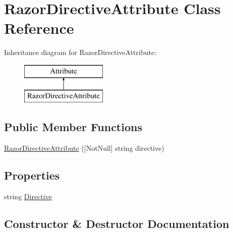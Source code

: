 \hypertarget{class_razor_directive_attribute}{}\section{Razor\+Directive\+Attribute Class Reference}
\label{class_razor_directive_attribute}
Inheritance diagram for Razor\+Directive\+Attribute\+:\begin{figure}[H]
\begin{center}
\leavevmode
\includegraphics[height=2.000000cm]{class_razor_directive_attribute}
\end{center}
\end{figure}
\subsection*{Public Member Functions}
\begin{DoxyCompactItemize}
\item 
\mbox{\hyperlink{class_razor_directive_attribute_abb658c024eaab7ddcd603692045d2fa1}{Razor\+Directive\+Attribute}} (\mbox{[}Not\+Null\mbox{]} string directive)
\end{DoxyCompactItemize}
\subsection*{Properties}
\begin{DoxyCompactItemize}
\item 
string \mbox{\hyperlink{class_razor_directive_attribute_a7c4cd40e119b2c1c2598ee7d66c3d3e9}{Directive}}
\end{DoxyCompactItemize}


\subsection{Constructor \& Destructor Documentation}
\mbox{\label{class_razor_directive_attribute_abb658c024eaab7ddcd603692045d2fa1}} 
